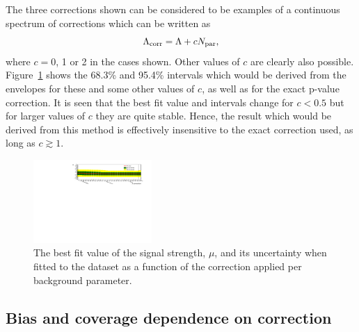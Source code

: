 The three corrections shown can be
considered to be examples of a continuous spectrum of corrections which can
be written as
\begin{displaymath}
\Lambda_{\mathrm{corr}} = \textrm{\ensuremath{\Lambda}} + cN_{\rm par},
\end{displaymath}
where $c=0$, 1 or 2 in the cases shown. Other values of $c$ are clearly
also possible.
Figure~\ref{fig:correction:correction} shows the
68.3\% and 95.4\% intervals which would be derived from the envelopes
for these and
some other values of $c$, as well as for the exact p-value correction.
It is seen that the best fit value and intervals change for $c<0.5$ but
for larger values of $c$ they are quite stable. Hence, the result which would
be derived from this method is effectively insensitive to the exact correction
used, as long as $c \gtrsim 1$.
%
\begin{figure}[htp]
\centering
\includegraphics[angle=90,width=0.4\textwidth]{correction/correction.pdf}
\caption{The best fit value of the signal strength, $\mu$, and its uncertainty when fitted to the dataset as a function of the correction applied per background parameter.}
\label{fig:correction:correction}
\end{figure}





\subsection{Bias and coverage dependence on correction}
\label{sec:correction:bias}

